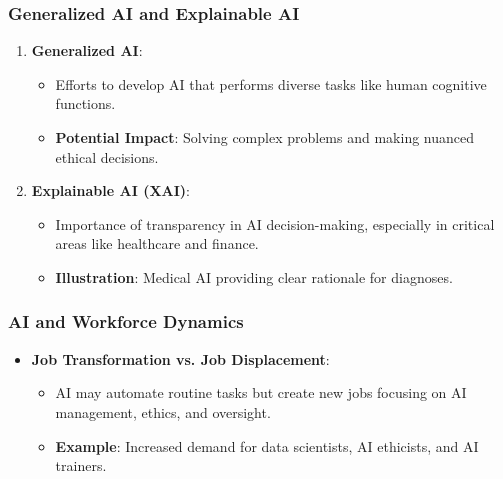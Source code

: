\documentclass[aspectratio=169]{beamer}
\begin{document}
\begin{frame}[fragile]
    \frametitle{Generalized AI and Explainable AI}
    \begin{enumerate}
        \item \textbf{Generalized AI}:
            \begin{itemize}
                \item Efforts to develop AI that performs diverse tasks like human cognitive functions.
                \item \textbf{Potential Impact}: Solving complex problems and making nuanced ethical decisions.
            \end{itemize}
        \item \textbf{Explainable AI (XAI)}:
            \begin{itemize}
                \item Importance of transparency in AI decision-making, especially in critical areas like healthcare and finance.
                \item \textbf{Illustration}: Medical AI providing clear rationale for diagnoses.
            \end{itemize}
    \end{enumerate}
\end{frame}

\begin{frame}[fragile]
    \frametitle{AI and Workforce Dynamics}
    \begin{itemize}
        \item \textbf{Job Transformation vs. Job Displacement}:
            \begin{itemize}
                \item AI may automate routine tasks but create new jobs focusing on AI management, ethics, and oversight.
                \item \textbf{Example}: Increased demand for data scientists, AI ethicists, and AI trainers.
            \end{itemize}
    \end{itemize}
\end{frame}
\end{document}
